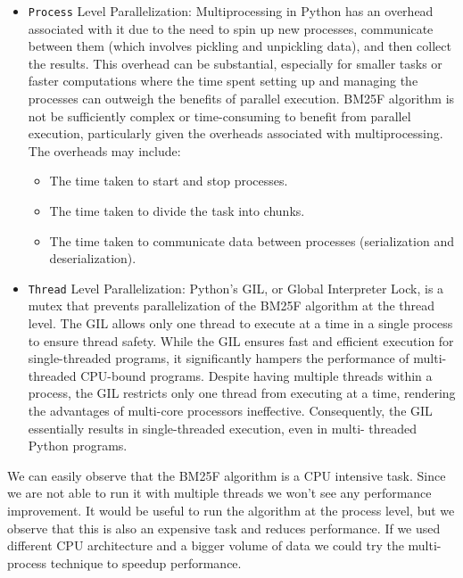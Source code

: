 \documentclass{article}
\begin{document}
\begin{itemize}
    \item {\texttt{Process} Level Parallelization}: Multiprocessing in Python has an overhead 
    associated with it due to the need to spin up new processes, communicate between them 
    (which involves pickling and unpickling data), and then collect the results. This overhead 
    can be substantial, especially for smaller tasks or faster computations where the time 
    spent setting up and managing the processes can outweigh the benefits of parallel execution.
    BM25F algorithm is not be sufficiently complex or time-consuming to benefit from parallel 
    execution, particularly given the overheads associated with multiprocessing. The overheads 
    may include:

    \begin{itemize}
        \item The time taken to start and stop processes.
        \item The time taken to divide the task into chunks.
        \item The time taken to communicate data between processes (serialization and deserialization).
    \end{itemize}

    \item {\texttt{Thread} Level Parallelization}: Python's GIL, or Global Interpreter Lock, 
    is a mutex that prevents parallelization of the BM25F algorithm at the thread level. The 
    GIL allows only one thread to execute at a time in a single process to ensure thread 
    safety. While the GIL ensures fast and efficient execution for single-threaded programs,
     it significantly hampers the performance of multi-threaded CPU-bound programs. Despite 
     having multiple threads within a process, the GIL restricts only one thread from 
     executing at a time, rendering the advantages of multi-core processors ineffective. 
     Consequently, the GIL essentially results in single-threaded execution, even in multi-
     threaded Python programs.
\end{itemize}

We can easily observe that the BM25F algorithm is a CPU intensive task. Since we are not able 
to run it with multiple threads we won't see any performance improvement. It would be useful 
to run the algorithm at the process level, but we observe that this is also an expensive task 
and reduces performance. If we used different CPU architecture and a bigger volume of data 
we could try the multi-process technique to speedup performance.
\newpage


\end{document}
